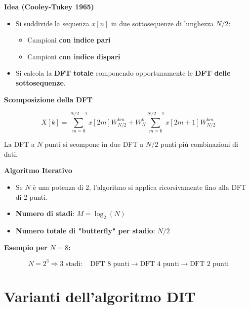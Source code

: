 \textbf{Idea (Cooley-Tukey 1965)}

\begin{itemize}
    \item Si suddivide la sequenza \( x[n] \) in due sottosequenze di lunghezza \( N/2 \):
    \begin{itemize}
        \item Campioni \textbf{con indice pari}
        \item Campioni \textbf{con indice dispari}
    \end{itemize}
    \item Si calcola la \textbf{DFT totale} componendo opportunamente le \textbf{DFT delle sottosequenze}.
\end{itemize}

\textbf{Scomposizione della DFT}

\[
X[k] = \sum_{m=0}^{N/2-1} x[2m] W_{N/2}^{km} + W_N^k \sum_{m=0}^{N/2-1} x[2m+1] W_{N/2}^{km}
\]

La DFT a \( N \) punti si scompone in due DFT a \( N/2 \) punti più combinazioni di dati.

\textbf{Algoritmo Iterativo}

\begin{itemize}
    \item Se \( N \) è una potenza di 2, l'algoritmo si applica ricorsivamente fino alla DFT di 2 punti.
    \item \textbf{Numero di stadi}: \( M = \log_2(N) \)
    \item \textbf{Numero totale di "butterfly" per stadio}: \( N/2 \)
\end{itemize}

\textbf{Esempio per \( N=8 \):}

\[
N = 2^3 \Rightarrow 3 \text{ stadi}: \quad \text{DFT 8 punti} \rightarrow \text{DFT 4 punti} \rightarrow \text{DFT 2 punti}
\]
\section*{Varianti dell'algoritmo DIT}

